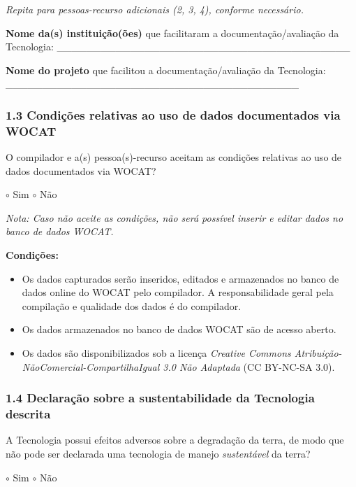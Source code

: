 \emph{Repita para pessoas-recurso adicionais (2, 3, 4), conforme necessário.}

\textbf{Nome da(s) instituição(ões)} que facilitaram a documentação/avaliação da Tecnologia: \_\_\_\_\_\_\_\_\_\_\_\_\_\_\_\_\_\_\_\_\_\_\_\_\_\_\_\_\_\_\_\_\_\_\_\_\_\_\_\_

\textbf{Nome do projeto} que facilitou a documentação/avaliação da Tecnologia: \_\_\_\_\_\_\_\_\_\_\_\_\_\_\_\_\_\_\_\_\_\_\_\_\_\_\_\_\_\_\_\_\_\_\_\_\_\_\_\_

\subsubsection{1.3 Condições relativas ao uso de dados documentados via WOCAT}\label{condiuxe7uxf5es-relativas-ao-uso-de-dados-documentados-via-wocat}

O compilador e a(s) pessoa(s)-recurso aceitam as condições relativas ao uso de dados documentados via WOCAT?

$\circ$ Sim $\circ$ Não

\emph{Nota: Caso não aceite as condições, não será possível inserir e editar dados no banco de dados WOCAT.}

\textbf{Condições:}

\begin{itemize}
\tightlist
\item
  Os dados capturados serão inseridos, editados e armazenados no banco de dados online do WOCAT pelo compilador. A responsabilidade geral pela compilação e qualidade dos dados é do compilador.
\item
  Os dados armazenados no banco de dados WOCAT são de acesso aberto.
\item
  Os dados são disponibilizados sob a licença \emph{Creative Commons Atribuição-NãoComercial-CompartilhaIgual 3.0 Não Adaptada} (CC BY-NC-SA 3.0).
\end{itemize}

\subsubsection{1.4 Declaração sobre a sustentabilidade da Tecnologia descrita}\label{declarauxe7uxe3o-sobre-a-sustentabilidade-da-tecnologia-descrita}

A Tecnologia possui efeitos adversos sobre a degradação da terra, de modo que não pode ser declarada uma tecnologia de manejo \emph{sustentável} da terra?

$\circ$ Sim $\circ$ Não

